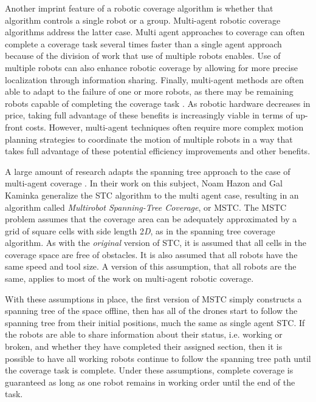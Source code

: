 Another imprint feature of a robotic coverage algorithm is whether that algorithm controls a single robot or a group. Multi-agent robotic coverage algorithms address the latter case. Multi agent approaches to coverage can often complete a coverage task several times faster than a single agent approach because of the division of work that use of multiple robots enables. Use of multiple robots can also enhance robotic coverage by allowing for more precise localization through information sharing. Finally, multi-agent methods are often able to adapt to the failure of one or more robots, as there may be remaining robots capable of completing the coverage task \cite{Choset}. As robotic hardware decreases in price, taking full advantage of these benefits is increasingly viable in terms of up-front costs. However, multi-agent techniques often require more complex motion planning strategies to coordinate the motion of multiple robots in a way that takes full advantage of these potential efficiency improvements and other benefits.


A large amount of research adapts the spanning tree approach to the case of multi-agent coverage \cite{Zheng}\cite{Hazon}. In their work on this subject, Noam Hazon and Gal Kaminka generalize the STC algorithm to the multi agent case, resulting in an algorithm called \textit{Multirobot Spanning-Tree Coverage}, or MSTC. The MSTC problem assumes that the coverage area can be adequately approximated by a grid of square cells with side length 2\textit{D}, as in the spanning tree coverage algorithm. As with the \textit{original} version of STC, it is assumed that all cells in the coverage space are free of obstacles. It is also assumed that all robots have the same speed and tool size. A version of this assumption, that all robots are the same, applies to most of the work on multi-agent robotic coverage.


With these assumptions in place, the first version of MSTC simply constructs a spanning tree of the space offline, then has all of the drones start to follow the spanning tree from their initial positions, much the same as single agent STC. If the robots are able to share information about their status, i.e. working or broken, and whether they have completed their assigned section, then it is possible to have all working robots continue to follow the spanning tree path until the coverage task is complete. Under these assumptions, complete coverage is guaranteed as long as one robot remains in working order until the end of the task.

